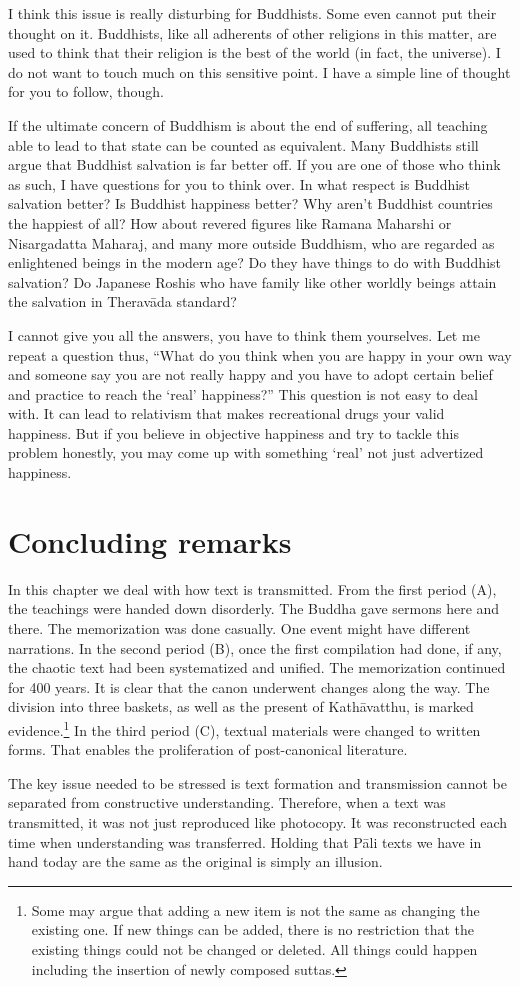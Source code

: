 I think this issue is really disturbing for Buddhists. Some even cannot put their thought on it. Buddhists, like all adherents of other religions in this matter, are used to think that their religion is the best of the world (in fact, the universe). I do not want to touch much on this sensitive point. I have a simple line of thought for you to follow, though.

If the ultimate concern of Buddhism is about the end of suffering, all teaching able to lead to that state can be counted as equivalent. Many Buddhists still argue that Buddhist salvation is far better off. If you are one of those who think as such, I have questions for you to think over. In what respect is Buddhist salvation better? Is Buddhist happiness better? Why aren't Buddhist countries the happiest of all? How about revered figures like Ramana Maharshi or Nisargadatta Maharaj, and many more outside Buddhism, who are regarded as enlightened beings in the modern age? Do they have things to do with Buddhist salvation? Do Japanese Roshis who have family like other worldly beings attain the salvation in Therav\=ada standard?

I cannot give you all the answers, you have to think them yourselves. Let me repeat a question thus, ``What do you think when you are happy in your own way and someone say you are not really happy and you have to adopt certain belief and practice to reach the `real' happiness?'' This question is not easy to deal with. It can lead to relativism that makes recreational drugs your valid happiness. But if you believe in objective happiness and try to tackle this problem honestly, you may come up with something `real' not just advertized happiness.

\section*{Concluding remarks}

In this chapter we deal with how text is transmitted. From the first period (A), the teachings were handed down disorderly. The Buddha gave sermons here and there. The memorization was done casually. One event might have different narrations. In the second period (B), once the first compilation had done, if any, the chaotic text had been systematized and unified. The memorization continued for 400 years. It is clear that the canon underwent changes along the way. The division into three baskets, as well as the present of Kath\=avatthu, is marked evidence.\footnote{Some may argue that adding a new item is not the same as changing the existing one. If new things can be added, there is no restriction that the existing things could not be changed or deleted. All things could happen including the insertion of newly composed suttas.} In the third period (C), textual materials were changed to written forms. That enables the proliferation of post-canonical literature.

The key issue needed to be stressed is text formation and transmission cannot be separated from constructive understanding. Therefore, when a text was transmitted, it was not just reproduced like photocopy. It was reconstructed each time when understanding was transferred. Holding that P\=ali texts we have in hand today are the same as the original is simply an illusion.
